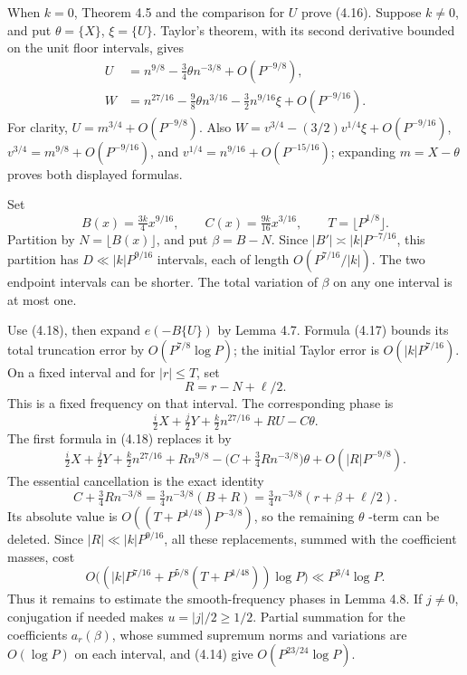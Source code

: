 \documentclass[11pt,a4paper]{article}
\begin{document}
When \(k=0\), Theorem 4.5 and the comparison for \(U\) prove (4.16).
Suppose \(k\ne0\), and put \(\theta=\{X\}\), \(\xi=\{U\}\). Taylor's
theorem, with its second derivative bounded on the unit floor intervals,
gives \[
\begin{split}
U&=n^{9/8}-\tfrac34\theta n^{-3/8}+O(P^{-9/8}),\\
W&=n^{27/16}-\tfrac98\theta n^{3/16}
-\tfrac32 n^{9/16}\xi+O(P^{-9/16}).
\end{split}
\tag{4.18}
\] For clarity, \(U=m^{3/4}+O(P^{-9/8})\). Also
\(W=v^{3/4}-(3/2)v^{1/4}\xi+O(P^{-9/16})\),
\(v^{3/4}=m^{9/8}+O(P^{-9/16})\), and
\(v^{1/4}=n^{9/16}+O(P^{-15/16})\); expanding \(m=X-\theta\) proves both
displayed formulas.

Set \[
B(x)=\tfrac{3k}{4}x^{9/16},\qquad
C(x)=\tfrac{9k}{16}x^{3/16},\qquad T=\lfloor P^{1/8}\rfloor.
\] Partition by \(N=\lfloor B(x)\rfloor\), and put \(\beta=B-N\). Since
\(|B'|\asymp |k|P^{-7/16}\), this partition has \(D\ll |k|P^{9/16}\)
intervals, each of length \(O(P^{7/16}/|k|)\). The two endpoint
intervals can be shorter. The total variation of \(\beta\) on any one
interval is at most one.

Use (4.18), then expand \(e(-B\{U\})\) by Lemma 4.7. Formula (4.17)
bounds its total truncation error by \(O(P^{7/8}\log P)\); the initial
Taylor error is \(O(|k|P^{7/16})\). On a fixed interval and for
\(|r|\le T\), set \[
R=r-N+\ell/2 .
\] This is a fixed frequency on that interval. The corresponding phase
is \[
\tfrac i2X+\tfrac j2Y+\tfrac k2 n^{27/16}+RU-C\theta .
\] The first formula in (4.18) replaces it by \[
\tfrac i2X+\tfrac j2Y+\tfrac k2 n^{27/16}+Rn^{9/8}
-\bigl(C+\tfrac34Rn^{-3/8}\bigr)\theta
+O(|R|P^{-9/8}).
\] The essential cancellation is the exact identity \[
C+\tfrac34Rn^{-3/8}
=\tfrac34n^{-3/8}(B+R)
=\tfrac34n^{-3/8}(r+\beta+\ell/2).
\tag{4.19}
\] Its absolute value is \(O((T+P^{1/48})P^{-3/8})\), so the remaining
\(\theta\) -term can be deleted. Since \(|R|\ll |k|P^{9/16}\), all these
replacements, summed with the coefficient masses, cost \[
O\bigl((|k|P^{7/16}+P^{5/8}(T+P^{1/48}))\log P\bigr)
\ll P^{3/4}\log P.
\] Thus it remains to estimate the smooth-frequency phases in Lemma 4.8.
If \(j\ne0\), conjugation if needed makes \(u=|j|/2\ge1/2\). Partial
summation for the coefficients \(a_r(\beta)\), whose summed supremum
norms and variations are \(O(\log P)\) on each interval, and (4.14) give
\(O(P^{23/24}\log P)\).
\end{document}
